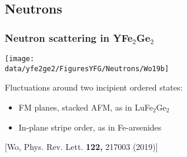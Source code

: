 \subsection{Neutrons}
\begin{frame}[label=YFGNeutrons]
\frametitle{Neutron scattering in YFe$_2$Ge$_2$}
\centerline{\texttt{[image: \\data/yfe2ge2/FiguresYFG/Neutrons/Wo19b]}}

Fluctuations around two incipient ordered states: 
\begin{itemize}
\item FM planes, stacked AFM, as in LuFe$_2$Ge$_2$
\item In-plane stripe order, as in Fe-arsenides
\end{itemize}

\vspace*{\fill}
\centerline{\makebox[\linewidth]{\rule{0.85\textwidth}{0.4pt}}}
\centerline{\scriptsize [Wo, Phys. Rev. Lett. {\bf 122,} 217003 (2019)]}
\end{frame}







